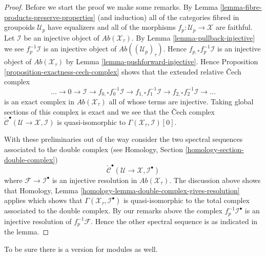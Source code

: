 \documentclass{stacks-project}
\theoremstyle{plain}
\theoremstyle{definition}
\theoremstyle{remark}
\numberwithin{equation}{subsection}
\begin{document}
\begin{proof}
Before we start the proof we make some remarks. By
Lemma \ref{lemma-fibre-products-preserve-properties}
(and induction) all of the categories fibred in groupoids $\mathcal{U}_p$
have equalizers and all of the morphisms $f_p : \mathcal{U}_p \to \mathcal{X}$
are faithful. Let $\mathcal{I}$ be an injective object
of $\textit{Ab}(\mathcal{X}_\tau)$. By
Lemma \ref{lemma-pullback-injective}
we see $f_p^{-1}\mathcal{I}$ is an injective object of
$\textit{Ab}((\mathcal{U}_p)_\tau)$.
Hence $f_{p, *}f_p^{-1}\mathcal{I}$ is an injective object of
$\textit{Ab}(\mathcal{X}_\tau)$ by
Lemma \ref{lemma-pushforward-injective}.
Hence
Proposition \ref{proposition-exactness-cech-complex}
shows that the extended relative {\v C}ech complex
$$
\ldots \to 0 \to
\mathcal{I} \to
f_{0, *}f_0^{-1}\mathcal{I} \to
f_{1, *}f_1^{-1}\mathcal{I} \to
f_{2, *}f_2^{-1}\mathcal{I} \to \ldots
$$
is an exact complex in $\textit{Ab}(\mathcal{X}_\tau)$ all of whose
terms are injective. Taking global sections of this complex is exact
and we see that the {\v C}ech complex
$\check{\mathcal{C}}^\bullet(\mathcal{U} \to \mathcal{X}, \mathcal{I})$
is quasi-isomorphic to $\Gamma(\mathcal{X}_\tau, \mathcal{I})[0]$.

\medskip\noindent
With these preliminaries out of the way consider the two spectral sequences
associated to the double complex (see
Homology, Section \ref{homology-section-double-complex})
$$
\check{\mathcal{C}}^\bullet(\mathcal{U} \to \mathcal{X}, \mathcal{I}^\bullet)
$$
where $\mathcal{F} \to \mathcal{I}^\bullet$ is an injective resolution
in $\textit{Ab}(\mathcal{X}_\tau)$.
The discussion above shows that
Homology, Lemma \ref{homology-lemma-double-complex-gives-resolution}
applies which shows that
$\Gamma(\mathcal{X}_\tau, \mathcal{I}^\bullet)$
is quasi-isomorphic to the total complex associated to the double complex.
By our remarks above the complex $f_p^{-1}\mathcal{I}^\bullet$ is an
injective resolution of $f_p^{-1}\mathcal{F}$. Hence the other spectral
sequence is as indicated in the lemma.
\end{proof}

\noindent
To be sure there is a version for modules as well.
\end{document}
